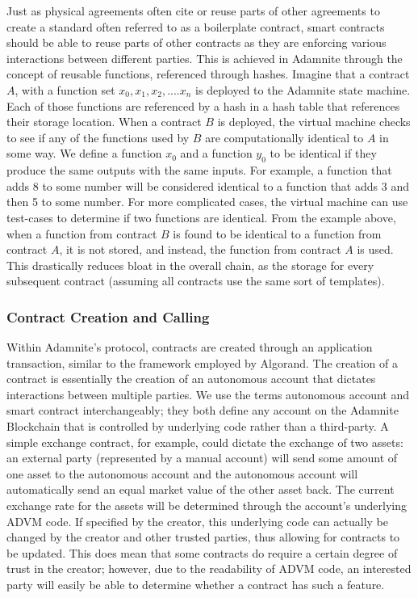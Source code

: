 \documentclass[conference]{IEEEtran}
\begin{document}
Just as physical agreements often cite or reuse parts of other agreements to create a standard often referred to as a boilerplate contract, smart contracts should be able to reuse parts of other contracts as they are enforcing various interactions between different parties. This is achieved in Adamnite through the concept of reusable functions, referenced through hashes. Imagine that a contract $A$, with a function set ${x_0,x_1,x_2,....x_n}$ is deployed to the Adamnite state machine. Each of those functions are referenced by a hash in a hash table that references their storage location. When a contract $B$ is deployed, the virtual machine checks to see if any of the functions used by $B$ are computationally identical to $A$ in some way. We define a function $x_0$ and a function $y_0$ to be identical if they produce the same outputs with the same inputs. For example, a function that adds 8 to some number will be considered identical to a function that adds 3 and then 5 to some number. For more complicated cases, the virtual machine can use test-cases to determine if two functions are identical. From the example above, when a function from contract $B$ is found to be identical to a function from contract $A$, it is not stored, and instead, the function from contract $A$ is used. This drastically reduces bloat in the overall chain, as the storage for every subsequent contract (assuming all contracts use the same sort of templates). 



\subsubsection{Contract Creation and Calling}
Within Adamnite's protocol, contracts are created through an application transaction, similar to the framework employed by Algorand. The creation of a contract is essentially the creation of an autonomous account that dictates interactions between multiple parties. We use the terms autonomous account and smart contract interchangeably; they both define any account on the Adamnite Blockchain that is controlled by underlying code rather than a third-party. A simple exchange contract, for example, could dictate the exchange of two assets: an external party (represented by a manual account) will send some amount of one asset to the autonomous account and the autonomous account will automatically send an equal market value of the other asset back. The current exchange rate for the assets will be determined through the account's underlying ADVM code. If specified by the creator, this underlying code can actually be changed by the creator and other trusted parties, thus allowing for contracts to be updated. This does mean that some contracts do require a certain degree of trust in the creator; however, due to the readability of ADVM code, an interested party will easily be able to determine whether a contract has such a feature.\\
\end{document}

